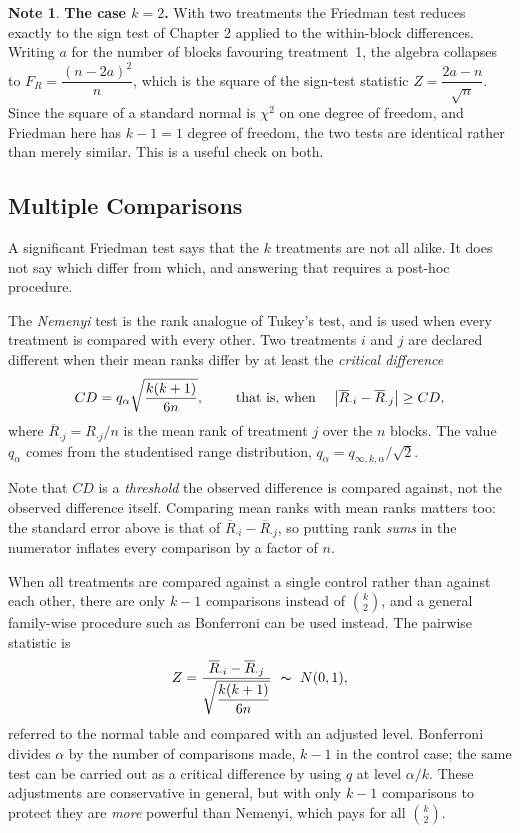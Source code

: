 \documentclass[11pt,a4paper]{article}
\theoremstyle{definition}
\newtheorem{note}[thm]{Note}
\begin{document}
\begin{note}
\textbf{The case $k = 2$.} With two treatments the Friedman test reduces exactly to
the sign test of Chapter 2 applied to the within-block differences. Writing $a$ for
the number of blocks favouring treatment~1, the algebra collapses to
$F_R = \dfrac{(n-2a)^{2}}{n}$, which is the square of the sign-test statistic
$Z = \dfrac{2a-n}{\sqrt{n}}$. Since the square of a standard normal is
$\chi^{2}$ on one degree of freedom, and Friedman here has $k - 1 = 1$ degree of
freedom, the two tests are identical rather than merely similar. This is a useful
check on both.
\end{note}

\subsection{Multiple Comparisons}
A significant Friedman test says that the $k$ treatments are not all alike. It does
not say which differ from which, and answering that requires a post-hoc procedure.

The \emph{Nemenyi} test is the rank analogue of Tukey's test, and is used when every
treatment is compared with every other. Two treatments $i$ and $j$ are declared
different when their mean ranks differ by at least the \emph{critical difference}
$$CD=q_{\alpha}\sqrt{\dfrac{k(k+1)}{6n}},
\hspace{0.8cm}\text{that is, when}\hspace{0.4cm}
\left|\overline{R}_{\cdot i}-\overline{R}_{\cdot j}\right|\geq CD ,$$
where $\overline{R}_{\cdot j}=R_{\cdot j}/n$ is the mean rank of treatment $j$ over
the $n$ blocks. The value $q_{\alpha}$ comes from the studentised range
distribution, $q_{\alpha}=q_{\infty,k,\alpha}/\sqrt{2}$.

Note that $CD$ is a \emph{threshold} the observed difference is compared against,
not the observed difference itself. Comparing mean ranks with mean ranks matters
too: the standard error above is that of $\overline{R}_{\cdot i}-\overline{R}_{\cdot j}$,
so putting rank \emph{sums} in the numerator inflates every comparison by a factor
of $n$.

When all treatments are compared against a single control rather than against each
other, there are only $k-1$ comparisons instead of $\binom{k}{2}$, and a general
family-wise procedure such as Bonferroni can be used instead. The pairwise
statistic is
$$Z=\dfrac{\overline{R}_{\cdot i}-\overline{R}_{\cdot j}}{\sqrt{\dfrac{k(k+1)}{6n}}}
\ \thicksim\ N(0,1),$$
referred to the normal table and compared with an adjusted level. Bonferroni
divides $\alpha$ by the number of comparisons made, $k-1$ in the control case; the
same test can be carried out as a critical difference by using $q$ at level
$\alpha/k$. These adjustments are conservative in general, but with only $k-1$
comparisons to protect they are \emph{more} powerful than Nemenyi, which pays for
all $\binom{k}{2}$.
\end{document}
